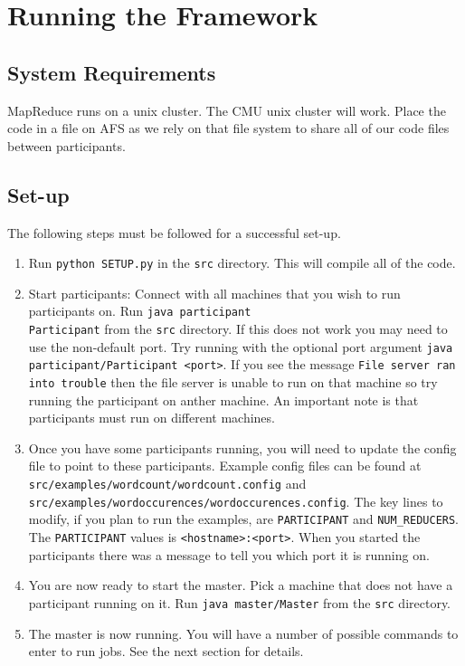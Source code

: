 \documentclass[12pt]{article}
\newcommand{\ttt}{\texttt}
\begin{document}
\maketitle

\pagebreak
\section{Running the Framework}

\subsection{System Requirements}

MapReduce runs on a unix cluster. The CMU unix cluster will work. Place the code in a file on AFS as we rely on that file system to share all of our code files between participants.

\subsection{Set-up}

The following steps must be followed for a successful set-up.

\begin{enumerate}
\item 
Run \ttt{python SETUP.py} in the \ttt{src} directory. This will compile all of the code.

\item
Start participants: Connect with all machines that you wish to run participants on. Run \ttt{java participant\\Participant} from the \ttt{src} directory. If this does not work you may need to use the non-default port. Try running with the optional port argument \ttt{java participant/Participant <port>}. If you see the message \ttt{File server ran into trouble} then the file server is unable to run on that machine so try running the participant on anther machine. An important note is that participants must run on different machines.

\item
Once you have some participants running, you will need to update the config file to point to these participants. Example config files can be found at \ttt{src/examples/wordcount/wordcount.config} and \ttt{src/examples/wordoccurences/wordoccurences.config}. The key lines to modify, if you plan to run the examples, are \ttt{PARTICIPANT} and \ttt{NUM\_REDUCERS}. The \ttt{PARTICIPANT} values is \ttt{<hostname>:<port>}. When you started the participants there was a message to tell you which port it is running on.

\item
You are now ready to start the master. Pick a machine that does not have a participant running on it. Run \ttt{java master/Master} from the \ttt{src} directory.

\item
The master is now running. You will have a number of possible commands to enter to run jobs. See the next section for details.

\end{enumerate}
\end{document}
